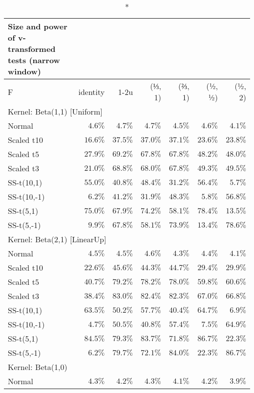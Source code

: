 \setlength{\LTpost}{0mm}
\begin{longtable}{lrrrrrr}
\caption*{
{\large Size and power of v-transformed tests (narrow window)}
} \\ 
\toprule
F & identity & \textbar{}1-2u\textbar{} & (⅓, 1) & (⅔, 1) & (½, ½) & (½, 2) \\ 
\midrule
\multicolumn{7}{l}{Kernel: Beta(1,1) [Uniform]} \\ 
\midrule
Normal & $4.6\%$ & $4.7\%$ & $4.7\%$ & $4.5\%$ & $4.6\%$ & $4.1\%$ \\ 
Scaled t10 & $16.6\%$ & $37.5\%$ & $37.0\%$ & $37.1\%$ & $23.6\%$ & $23.8\%$ \\ 
Scaled t5 & $27.9\%$ & $69.2\%$ & $67.8\%$ & $67.8\%$ & $48.2\%$ & $48.0\%$ \\ 
Scaled t3 & $21.0\%$ & $68.8\%$ & $68.0\%$ & $67.8\%$ & $49.3\%$ & $49.5\%$ \\ 
SS-t(10,1) & $55.0\%$ & $40.8\%$ & $48.4\%$ & $31.2\%$ & $56.4\%$ & $5.7\%$ \\ 
SS-t(10,-1) & $6.2\%$ & $41.2\%$ & $31.9\%$ & $48.3\%$ & $5.8\%$ & $56.8\%$ \\ 
SS-t(5,1) & $75.0\%$ & $67.9\%$ & $74.2\%$ & $58.1\%$ & $78.4\%$ & $13.5\%$ \\ 
SS-t(5,-1) & $9.9\%$ & $67.8\%$ & $58.1\%$ & $73.9\%$ & $13.4\%$ & $78.6\%$ \\ 
\midrule
\multicolumn{7}{l}{Kernel: Beta(2,1) [LinearUp]} \\ 
\midrule
Normal & $4.5\%$ & $4.5\%$ & $4.6\%$ & $4.3\%$ & $4.4\%$ & $4.1\%$ \\ 
Scaled t10 & $22.6\%$ & $45.6\%$ & $44.3\%$ & $44.7\%$ & $29.4\%$ & $29.9\%$ \\ 
Scaled t5 & $40.7\%$ & $79.2\%$ & $78.2\%$ & $78.0\%$ & $59.8\%$ & $60.6\%$ \\ 
Scaled t3 & $38.4\%$ & $83.0\%$ & $82.4\%$ & $82.3\%$ & $67.0\%$ & $66.8\%$ \\ 
SS-t(10,1) & $63.5\%$ & $50.2\%$ & $57.7\%$ & $40.4\%$ & $64.7\%$ & $6.9\%$ \\ 
SS-t(10,-1) & $4.7\%$ & $50.5\%$ & $40.8\%$ & $57.4\%$ & $7.5\%$ & $64.9\%$ \\ 
SS-t(5,1) & $84.5\%$ & $79.3\%$ & $83.7\%$ & $71.8\%$ & $86.7\%$ & $22.3\%$ \\ 
SS-t(5,-1) & $6.2\%$ & $79.7\%$ & $72.1\%$ & $84.0\%$ & $22.3\%$ & $86.7\%$ \\ 
\midrule
\multicolumn{7}{l}{Kernel: Beta(1,0)} \\ 
\midrule
Normal & $4.3\%$ & $4.2\%$ & $4.3\%$ & $4.1\%$ & $4.2\%$ & $3.9\%$ \\ 

\end{longtable}
